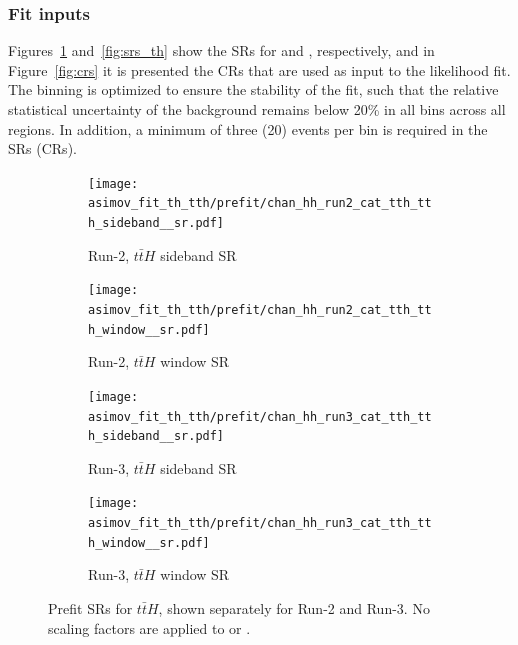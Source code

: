 \subsubsection*{Fit inputs}
Figures~\ref{fig:srs_tth} and~\ref{fig:srs_th} show the SRs for \ttH and \thqb, respectively, and in Figure~\ref{fig:crs} it is presented the CRs that are used as input to the likelihood fit. The binning is optimized to ensure the stability of the fit, such that the relative statistical uncertainty of the background remains below 20\% in all bins across all regions. In addition, a minimum of three (20) events per bin is required in the SRs (CRs).

\begin{figure}[htbp]
  \centering
  \begin{subfigure}[t]{0.45\textwidth}
    \centering
    \texttt{[image: asimov\_fit\_th\_tth/prefit/chan\_hh\_run2\_cat\_tth\_tth\_sideband\_\_sr.pdf]}
    \caption{Run-2, $t\bar{t}H$ sideband SR}
  \end{subfigure}
  \hfill
  \begin{subfigure}[t]{0.45\textwidth}
    \centering
    \texttt{[image: asimov\_fit\_th\_tth/prefit/chan\_hh\_run2\_cat\_tth\_tth\_window\_\_sr.pdf]}
    \caption{Run-2, $t\bar{t}H$ window SR}
  \end{subfigure}

  \vspace{0.4cm}
  \begin{subfigure}[t]{0.45\textwidth}
    \centering
    \texttt{[image: asimov\_fit\_th\_tth/prefit/chan\_hh\_run3\_cat\_tth\_tth\_sideband\_\_sr.pdf]}
    \caption{Run-3, $t\bar{t}H$ sideband SR}
  \end{subfigure}
  \hfill
  \begin{subfigure}[t]{0.45\textwidth}
    \centering
    \texttt{[image: asimov\_fit\_th\_tth/prefit/chan\_hh\_run3\_cat\_tth\_tth\_window\_\_sr.pdf]}
    \caption{Run-3, $t\bar{t}H$ window SR}
  \end{subfigure}

  \caption{Prefit SRs for $t\bar{t}H$, shown separately for Run-2 and Run-3. No scaling factors are applied to \ztautau or \ttbar.}
  \label{fig:srs_tth}
\end{figure}



